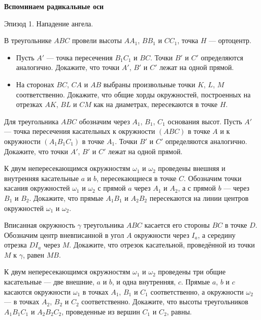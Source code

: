 \centerline{\bf \Huge Вспоминаем радикальные оси}

\begin{flushright}
        \scriptsize{Эпизод 1. Нападение ангела.}
\end{flushright}

В треугольнике $ABC$ провели высоты $AA_1$, $BB_1$ и $CC_1$, точка $H$ --- ортоцентр.
\begin{itemize}
    \item[(a)] Пусть $A'$ --- точка пересечения $B_1C_1$ и $BC$. Точки $B'$ и $C'$ определяются аналогично. Докажите, что точки $A'$, $B'$ и $C'$ лежат на одной прямой.
    \item[(b)] На сторонах $BC$, $CA$ и $AB$ выбраны произвольные точки $K$, $L$, $M$ соответственно. Докажите, что общие хорды окружностей, построенных на отрезках $AK$, $BL$ и $CM$ как на диаметрах, пересекаются в точке $H$.
\end{itemize}

Для треугольника $ABC$ обозначим через $A_1$, $B_1$, $C_1$ основания высот. Пусть $A'$ --- точка пересечения касательных к окружности $(ABC)$ в точке $A$ и к окружности $(A_1B_1C_1)$ в точке $A_1$. Точки $B'$ и $C'$ определяются аналогично. Докажите, что точки $A'$, $B'$ и $C'$ лежат на одной прямой.

К двум непересекающимся окружностям $\omega_1$ и $\omega_2$ проведены внешняя и внутренняя касательные $a$ и $b$, пересекающиеся в точке $C$. Обозначим точки касания окружностей $\omega_1$ и $\omega_2$ с прямой $a$ через $A_1$ и $A_2$, а с прямой $b$ --- через $B_1$ и $B_2$. Докажите, что прямые $A_1B_1$ и $A_2B_2$ пересекаются на линии центров окружностей $\omega_1$ и $\omega_2$.

Вписанная окружность $\gamma$ треугольника $ABC$ касается его стороны $BC$ в точке $D$. Обозначим центр вневписанной в угол $A$ окружности через $I_a$, а середину отрезка $DI_a$ через $M$. Докажите, что отрезок касательной, проведённой из точки $M$ к $\gamma$, равен $MB$.

К двум непересекающимся окружностям $\omega_1$ и $\omega_2$ проведены три общие касательные --- две внешние, $a$ и $b$, и одна внутренняя, $c$. Прямые $a$, $b$ и $c$ касаются окружности $\omega_1$ в точках $A_1$, $B_1$ и $C_1$ соответственно, а окружности $\omega_2$ --- в точках $A_2$, $B_2$ и $C_2$ соответственно. Докажите, что высоты треугольников $A_1B_1C_1$ и $A_2B_2C_2$, проведенные из вершин $C_1$ и $C_2$, равны.

